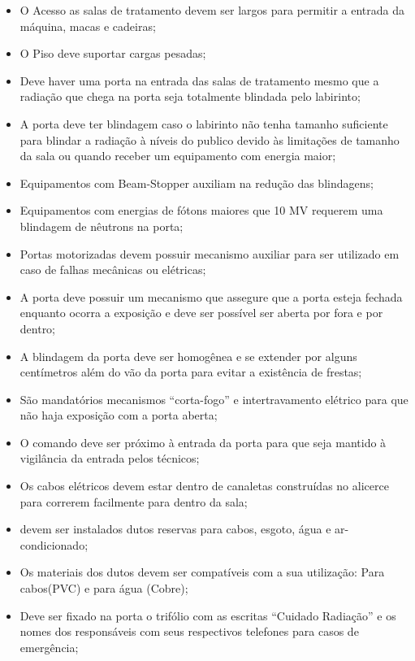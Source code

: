 \documentclass[11pt,a4paper]{article}
\begin{document}
        \begin{itemize}
            \item O Acesso as salas de tratamento devem ser largos para permitir a entrada da máquina, macas e cadeiras;
            \item O Piso deve suportar cargas pesadas;
            \item Deve haver uma porta na entrada das salas de tratamento mesmo que a radiação que chega na porta seja totalmente blindada pelo labirinto;
            \item A porta deve ter blindagem caso o labirinto não tenha tamanho suficiente para blindar a radiação à níveis do publico devido às limitações de tamanho da sala ou quando receber um equipamento com energia maior;
            \item Equipamentos com Beam-Stopper auxiliam na redução das blindagens;
            \item Equipamentos com energias de fótons maiores que 10 MV requerem uma blindagem de nêutrons na porta;
            \item Portas motorizadas devem possuir mecanismo auxiliar para ser utilizado em caso de falhas mecânicas ou elétricas;
            \item A porta deve possuir um mecanismo que assegure que a porta esteja fechada enquanto ocorra a exposição e deve ser possível ser aberta por fora e por dentro;
            \item A blindagem da porta deve ser homogênea e se extender por alguns centímetros além do vão da porta para evitar a existência de frestas;
            \item  São mandatórios mecanismos ``corta-fogo'' e intertravamento elétrico para que não haja exposição com a porta aberta;
            \item O comando deve ser próximo à entrada da porta para que seja mantido à vigilância da entrada pelos técnicos;
            \item Os cabos elétricos devem estar dentro de canaletas construídas no alicerce para correrem facilmente para dentro da sala;
            \item devem ser instalados dutos reservas para cabos, esgoto, água e ar-condicionado;
            \item Os materiais dos dutos devem ser compatíveis com a sua utilização: Para cabos(PVC) e para água (Cobre);
            \item Deve ser fixado na porta o trifólio com as escritas ``Cuidado Radiação'' e os nomes dos responsáveis com seus respectivos telefones para casos de emergência;

\end{itemize}
\end{document}
